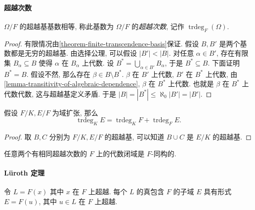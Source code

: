 \paragraph{超越次数}


\begin{proposition}
  \( \Omega/F \) 的超越基基数相等, 称此基数为 \( \Omega/F \) 的\emph{超越次数},
  记作 \( \operatorname{trdeg}_F(\Omega) \).
\end{proposition}
\begin{proof}
  有限情况由\cref{theorem-finite-transcendence-basis}保证.
  假设 \( B, B' \) 是两个基数都是无穷的超越基.
  由选择公理, 可以假设 \( \left\lvert B' \right\rvert < \left\lvert B
  \right\rvert \).
  对任意 \( \alpha \in B' \), 存在有限集 \( B_{\alpha} \subseteq B \) 使得 \(
  \alpha \) 在 \( B_{\alpha} \) 上代数.
  设 \( B^* = \bigcup_{\alpha \in B'} B_{\alpha} \), 于是 \( B^* \subseteq B \).
  下面证明 \( B^* = B \).
  假设不然, 那么存在 \( \beta \in B \setminus B^* \).
  \( \beta \) 在 \( B' \) 上代数, \( B' \) 在 \( B^* \) 上代数,
  由\cref{lemma-transitivity-of-algebraic-dependence}, \( \beta \) 在 \( B^* \)
  上代数.
  也就是 \( \beta \) 在 \( B^* \) 上代数代数, 这与超越基定义矛盾.
  于是 \( \left\lvert B \right\rvert = \left\lvert B^* \right\rvert \leq \aleph_0
  \left\lvert B' \right\rvert = \left\lvert B' \right\rvert \).
\end{proof}

\begin{proposition}
  假设 \( F/K, E/F \) 为域扩张, 那么
  \[
    \operatorname{trdeg}_K E = \operatorname{trdeg}_K F +
    \operatorname{trdeg}_F E.
  \]
\end{proposition}
\begin{proof}
  取 \( B, C \) 分别为 \( F/K, E/F \) 的超越基, 可以知道 \( B \cup C \) 是 \(
  E/K \) 的超越基.
\end{proof}

\begin{proposition}
  任意两个有相同超越次数的 \( F \) 上的代数闭域是 \( F \)-同构的.
\end{proposition}

\paragraph{L\"{u}roth 定理}

\begin{theorem}[L\"{u}roth]
  令 \( L = F(x) \) 其中 \( x \) 在 \( F \) 上超越.
  每个 \( L \) 的真包含 \( F \) 的子域 \( E \) 具有形式 \( E = F(u) \), 其中 \(
  u \in L \) 在 \( F \) 上超越.
\end{theorem}
